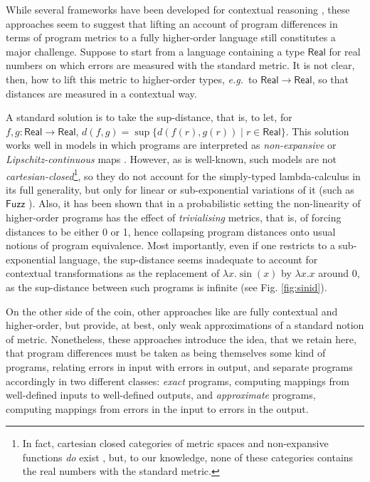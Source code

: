   While several frameworks  have been developed for contextual reasoning \cite{10.1145/1932681.1863568,Gaboardi_2013,Azevedo_de_Amorim_2017,chaudhuri, dallago:differential-stlc},  these approaches seem to suggest that lifting an account of program
differences in terms of program metrics to a fully higher-order language still constitutes a major challenge. 
%
Suppose to start from a language  containing a type $\mathsf{Real}$ for real numbers on which errors are measured with the standard metric. It is not clear, then, how to lift this metric to higher-order types, \emph{e.g.}~to $\mathsf{Real}\to \mathsf{Real}$, so that distances are measured in a contextual way.



A standard solution is to take the sup-distance, that is, to let, for $f,g:\mathsf{Real}\to \mathsf{Real}$, $d(f,g)=\sup\{d(f(r),g(r))\mid r\in \mathsf{Real}\}$. This solution works well in models in which programs are interpreted as \emph{non-expansive} or \emph{Lipschitz-continuous} maps \cite{Hofmann2014, Azevedo_de_Amorim_2017}. However, as is well-known, such models are not \emph{cartesian-closed}\footnote{In fact, cartesian closed categories of metric spaces and non-expansive functions \emph{do} exist \cite{Escardo1999, Stubbe2009}, but, to our knowledge, none of these categories contains the real numbers with the standard metric.}, so they do not account for 
 the simply-typed lambda-calculus in its full generality, but only for linear or sub-exponential variations of it (such as $\mathsf{Fuzz}$ \cite{10.1145/1932681.1863568,Gaboardi_2013,Azevedo_de_Amorim_2017}).
 Also, it has been shown \cite{10.1109/LICS.2015.64} that in a probabilistic setting the non-linearity of higher-order programs has the effect of \emph{trivialising} metrics, that is, of forcing distances to be either 0 or 1, hence collapsing program distances onto usual notions of program equivalence.
Most importantly, even if one restricts to a sub-exponential language, the sup-distance seems inadequate to account for contextual transformations as the replacement of $\lambda x.\sin(x)$ by $\lambda x.x$ around 0,  as the sup-distance between such programs is infinite (see Fig. \ref{fig:sinid}). 
 
 
On the other side of the coin, other approaches like \cite{chaudhuri, dallago:differential-stlc} are fully contextual and higher-order, but provide, at best, only weak approximations of a standard notion of metric.  
 Nonetheless, these approaches introduce the idea, that we retain here, that program differences must be taken as being themselves some kind of programs, relating errors in input with errors in  output,  and separate programs accordingly in two different classes: \emph{exact} programs, computing mappings from well-defined inputs to well-defined outputs, and \emph{approximate} programs, computing mappings from errors in the input to errors in the output.
%

